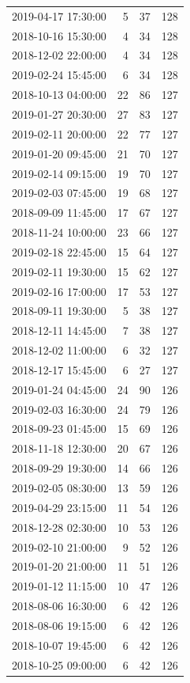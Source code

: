 \begin{tabular}{lrrr}
2019-04-17 17:30:00 & 5 & 37 & 128 \\
2018-10-16 15:30:00 & 4 & 34 & 128 \\
2018-12-02 22:00:00 & 4 & 34 & 128 \\
2019-02-24 15:45:00 & 6 & 34 & 128 \\
2018-10-13 04:00:00 & 22 & 86 & 127 \\
2019-01-27 20:30:00 & 27 & 83 & 127 \\
2019-02-11 20:00:00 & 22 & 77 & 127 \\
2019-01-20 09:45:00 & 21 & 70 & 127 \\
2019-02-14 09:15:00 & 19 & 70 & 127 \\
2019-02-03 07:45:00 & 19 & 68 & 127 \\
2018-09-09 11:45:00 & 17 & 67 & 127 \\
2018-11-24 10:00:00 & 23 & 66 & 127 \\
2019-02-18 22:45:00 & 15 & 64 & 127 \\
2019-02-11 19:30:00 & 15 & 62 & 127 \\
2019-02-16 17:00:00 & 17 & 53 & 127 \\
2018-09-11 19:30:00 & 5 & 38 & 127 \\
2018-12-11 14:45:00 & 7 & 38 & 127 \\
2018-12-02 11:00:00 & 6 & 32 & 127 \\
2018-12-17 15:45:00 & 6 & 27 & 127 \\
2019-01-24 04:45:00 & 24 & 90 & 126 \\
2019-02-03 16:30:00 & 24 & 79 & 126 \\
2018-09-23 01:45:00 & 15 & 69 & 126 \\
2018-11-18 12:30:00 & 20 & 67 & 126 \\
2018-09-29 19:30:00 & 14 & 66 & 126 \\
2019-02-05 08:30:00 & 13 & 59 & 126 \\
2019-04-29 23:15:00 & 11 & 54 & 126 \\
2018-12-28 02:30:00 & 10 & 53 & 126 \\
2019-02-10 21:00:00 & 9 & 52 & 126 \\
2019-01-20 21:00:00 & 11 & 51 & 126 \\
2019-01-12 11:15:00 & 10 & 47 & 126 \\
2018-08-06 16:30:00 & 6 & 42 & 126 \\
2018-08-06 19:15:00 & 6 & 42 & 126 \\
2018-10-07 19:45:00 & 6 & 42 & 126 \\
2018-10-25 09:00:00 & 6 & 42 & 126 \\

\end{tabular}

